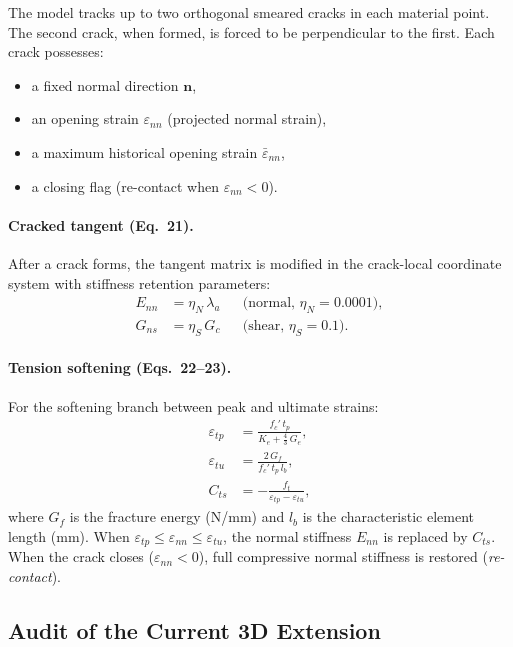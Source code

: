 The model tracks up to two orthogonal smeared cracks in each material point.
The second crack, when formed, is forced to be perpendicular to the first.
Each crack possesses:
\begin{itemize}
  \item a fixed normal direction $\mathbf{n}$,
  \item an opening strain $\varepsilon_{nn}$ (projected normal strain),
  \item a maximum historical opening strain $\bar\varepsilon_{nn}$,
  \item a closing flag (re-contact when $\varepsilon_{nn} < 0$).
\end{itemize}

\paragraph{Cracked tangent (Eq.~21).}
After a crack forms, the tangent matrix is modified in the crack-local
coordinate system with stiffness retention parameters:
\begin{align}
  E_{nn} &= \eta_N\,\lambda_a & &\text{(normal, } \eta_N = 0.0001\text{)}, \label{eq:kb-eta-N} \\
  G_{ns} &= \eta_S\,G_c       & &\text{(shear, }  \eta_S = 0.1\text{)}.    \label{eq:kb-eta-S}
\end{align}

\paragraph{Tension softening (Eqs.~22--23).}
For the softening branch between peak and ultimate strains:
\begin{align}
  \varepsilon_{tp} &= \frac{f_c'\,t_p}{K_e + \tfrac{4}{3}\,G_e},
  \label{eq:kb-eps-tp} \\
  \varepsilon_{tu} &= \frac{2\,G_f}{f_c'\,t_p\,l_b},
  \label{eq:kb-eps-tu} \\
  C_{ts} &= -\frac{f_t}{\varepsilon_{tp} - \varepsilon_{tu}},
  \label{eq:kb-Cts}
\end{align}
where $G_f$ is the fracture energy (N/mm) and $l_b$ is the characteristic
element length (mm).  When $\varepsilon_{tp} \le \varepsilon_{nn} \le
\varepsilon_{tu}$, the normal stiffness $E_{nn}$ is replaced by $C_{ts}$.
When the crack closes ($\varepsilon_{nn}<0$), full compressive normal
stiffness is restored (\emph{re-contact}).

\subsection{Audit of the Current 3D Extension}
\label{ssec:kb-3d-audit}

